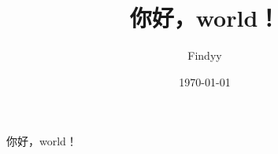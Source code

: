 \documentclass{ctexart}
\title{你好，world！}
\author{Findyy}
\date{\today}
\begin{document}
\maketitle
你好，world！    
\end{document}
